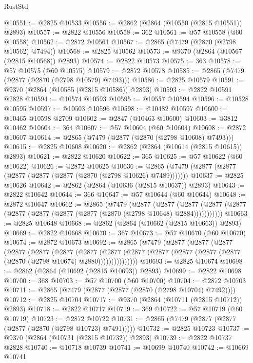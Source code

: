 \begin{lexlean}{RustStd}
\begin{coremodule}
@10551 := @2825 @10533
@10556 := @2862 (@2864 (@10550 (@2815 @10551)) @2893)
@10557 := @2822 @10556
@10558 := 362
@10561 := @57 @10558 (@60 @10558)
@10562 := @2872 @10561
@10567 := @2865 (@7479 (@2870 (@2798 @10562) @7494))
@10568 := @2825 @10562
@10573 := @9370 (@2864 (@10567 (@2815 @10568)) @2893)
@10574 := @2822 @10573
@10575 := 363
@10578 := @57 @10575 (@60 @10575)
@10579 := @2872 @10578
@10585 := @2865 (@7479 (@2877 (@2870 (@2798 @10579) @7493)))
@10586 := @2825 @10579
@10591 := @9370 (@2864 (@10585 (@2815 @10586)) @2893)
@10593 := @2822 @10591 @2828
@10594 := @10574 @10593
@10595 := @10557 @10594
@10596 := @10528 @10595
@10597 := @10503 @10596
@10598 := @10482 @10597
@10600 := @10465 @10598 @2709
@10602 := @2847 (@10463 @10600)
@10603 := @3812 @10462
@10604 := 364
@10607 := @57 @10604 (@60 @10604)
@10608 := @2872 @10607
@10614 := @2865 (@7479 (@2877 (@2870 (@2798 @10608) @7493)))
@10615 := @2825 @10608
@10620 := @2862 (@2864 (@10614 (@2815 @10615)) @2893)
@10621 := @2822 @10620
@10622 := 365
@10625 := @57 @10622 (@60 @10622)
@10626 := @2872 @10625
@10636 := @2865 (@7479 (@2877 (@2877 (@2877 (@2877 (@2877 (@2870 (@2798 @10626) @7489)))))))
@10637 := @2825 @10626
@10642 := @2862 (@2864 (@10636 (@2815 @10637)) @2893)
@10643 := @2822 @10642
@10644 := 366
@10647 := @57 @10644 (@60 @10644)
@10648 := @2872 @10647
@10662 := @2865
    (@7479
      (@2877
        (@2877
          (@2877 (@2877 (@2877 (@2877 (@2877 (@2877 (@2877 (@2870 (@2798 @10648) @2884)))))))))))
@10663 := @2825 @10648
@10668 := @2862 (@2864 (@10662 (@2815 @10663)) @2893)
@10669 := @2822 @10668
@10670 := 367
@10673 := @57 @10670 (@60 @10670)
@10674 := @2872 @10673
@10692 := @2865
    (@7479
      (@2877
        (@2877
          (@2877
            (@2877
              (@2877
                (@2877
                  (@2877
                    (@2877
                      (@2877 (@2877 (@2877 (@2877 (@2877 (@2870 (@2798 @10674) @2880)))))))))))))))
@10693 := @2825 @10674
@10698 := @2862 (@2864 (@10692 (@2815 @10693)) @2893)
@10699 := @2822 @10698
@10700 := 368
@10703 := @57 @10700 (@60 @10700)
@10704 := @2872 @10703
@10711 := @2865 (@7479 (@2877 (@2877 (@2870 (@2798 @10704) @7492))))
@10712 := @2825 @10704
@10717 := @9370 (@2864 (@10711 (@2815 @10712)) @2893)
@10718 := @2822 @10717
@10719 := 369
@10722 := @57 @10719 (@60 @10719)
@10723 := @2872 @10722
@10731 := @2865 (@7479 (@2877 (@2877 (@2877 (@2870 (@2798 @10723) @7491)))))
@10732 := @2825 @10723
@10737 := @9370 (@2864 (@10731 (@2815 @10732)) @2893)
@10739 := @2822 @10737 @2828
@10740 := @10718 @10739
@10741 := @10699 @10740
@10742 := @10669 @10741

\end{coremodule}
\end{lexlean}
